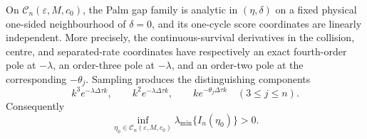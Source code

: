 \begin{proposition}
\label{prop:sampled-double-pole-nondegeneracy-main}
On \(\mathcal C_n(\varepsilon,M,c_0)\), the Palm gap family is analytic in
\((\eta,\delta)\) on a fixed physical one-sided neighbourhood of
\(\delta=0\), and its one-cycle score coordinates are linearly independent.
More precisely, the continuous-survival derivatives in the collision,
centre, and separated-rate coordinates have respectively an exact
fourth-order pole at \(-\lambda\), an order-three pole at \(-\lambda\), and
an order-two pole at the corresponding \(-\theta_j\).  Sampling produces the
distinguishing components
\begin{equation}
 k^3e^{-\lambda\Delta\tau k},\qquad
 k^2e^{-\lambda\Delta\tau k},\qquad
 ke^{-\theta_j\Delta\tau k}\quad(3\le j\le n).
\label{eq:main-distinguishing-components}
\end{equation}
Consequently
\begin{equation}
 \inf_{\eta_0\in\mathcal C_n(\varepsilon,M,c_0)}
 \lambda_{\min}\{I_n(\eta_0)\}>0.
\label{eq:main-information-nondegeneracy}
\end{equation}
\end{proposition}

